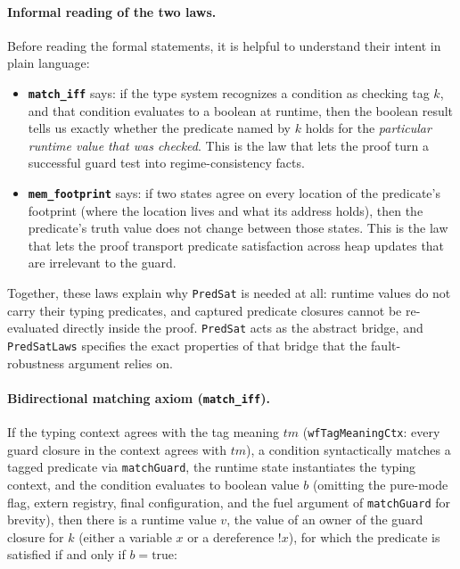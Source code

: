 \documentclass[12pt]{article}
\begin{document}
\paragraph{Informal reading of the two laws.}
Before reading the formal statements, it is helpful to understand their intent
in plain language:

\begin{itemize}
    \item \textbf{\texttt{match\_iff}} says: if the type system recognizes a
    condition as checking tag \(k\), and that condition evaluates to a boolean
    at runtime, then the boolean result tells us exactly whether the predicate
    named by \(k\) holds for the \emph{particular runtime value that was
    checked}.  This is the law that lets the proof turn a successful guard test
    into regime-consistency facts.
    \item \textbf{\texttt{mem\_footprint}} says: if two states agree on
    every location of the predicate's footprint (where the location lives and
    what its address holds), then the predicate's truth value does not change
    between those states.  This is the law that lets the proof transport
    predicate satisfaction across heap updates that are irrelevant to the
    guard.
\end{itemize}

Together, these laws explain why \texttt{PredSat} is needed at all:
runtime values do not carry their typing predicates, and captured predicate
closures cannot be re-evaluated directly inside the proof.  \texttt{PredSat}
acts as the abstract bridge, and \texttt{PredSatLaws} specifies the exact
properties of that bridge that the fault-robustness argument relies on.

\paragraph{Bidirectional matching axiom (\texttt{match\_iff}).} If the typing
context agrees with the tag meaning $tm$ (\texttt{wfTagMeaningCtx}: every guard
closure in the context agrees with $tm$), a condition syntactically matches a
tagged predicate via \texttt{matchGuard}, the runtime state instantiates the
typing context, and the condition evaluates to boolean value $b$ (omitting the
pure-mode flag, extern registry, final configuration, and the fuel argument of
\texttt{matchGuard} for brevity), then there is a runtime value $v$, the value of
an owner of the guard closure for $k$ (either a variable \(x\) or a dereference
\(!x\)), for which the predicate is satisfied if and only if $b = \text{true}$:
\end{document}
